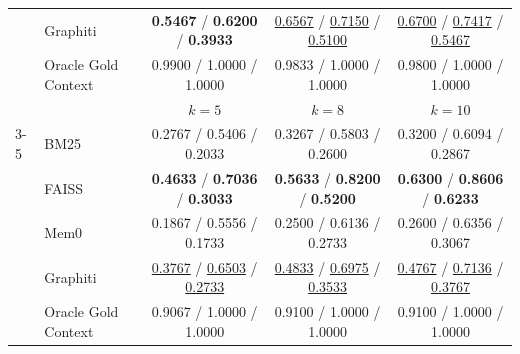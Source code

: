 \begin{table}[t]
\begin{tabular*}{\textwidth}{@{\extracolsep{\fill}}llccc@{}}
 & Graphiti & \textbf{0.5467} / \textbf{0.6200} / \textbf{0.3933} & \underline{0.6567} / \underline{0.7150} / \underline{0.5100} & \underline{0.6700} / \underline{0.7417} / \underline{0.5467} \\
 & Oracle Gold Context & 0.9900 / 1.0000 / 1.0000 & 0.9833 / 1.0000 / 1.0000 & 0.9800 / 1.0000 / 1.0000 \\
\midrule
 & & $k{=}5$ & $k{=}8$ & $k{=}10$ \\
\cmidrule(lr){3-5}
\multirow{5}{*}{Temporal ordering}
 & BM25 & 0.2767 / 0.5406 / 0.2033 & 0.3267 / 0.5803 / 0.2600 & 0.3200 / 0.6094 / 0.2867 \\
 & FAISS & \textbf{0.4633} / \textbf{0.7036} / \textbf{0.3033} & \textbf{0.5633} / \textbf{0.8200} / \textbf{0.5200} & \textbf{0.6300} / \textbf{0.8606} / \textbf{0.6233} \\
 & Mem0 & 0.1867 / 0.5556 / 0.1733 & 0.2500 / 0.6136 / 0.2733 & 0.2600 / 0.6356 / 0.3067 \\
 & Graphiti & \underline{0.3767} / \underline{0.6503} / \underline{0.2733} & \underline{0.4833} / \underline{0.6975} / \underline{0.3533} & \underline{0.4767} / \underline{0.7136} / \underline{0.3767} \\
 & Oracle Gold Context & 0.9067 / 1.0000 / 1.0000 & 0.9100 / 1.0000 / 1.0000 & 0.9100 / 1.0000 / 1.0000 \\
\bottomrule
\end{tabular*}
\end{table}
